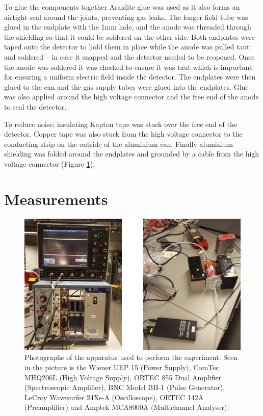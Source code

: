 To glue the components together Araldite glue was used as it also forms an airtight seal around the joints, preventing gas leaks. The longer field tube was glued in the endplate with the 1mm hole, and the anode was threaded through the shielding so that it could be soldered on the other side. Both endplates were taped onto the detector to hold them in place while the anode was pulled taut and soldered -- in case it snapped and the detector needed to be reopened. Once the anode was soldered it was checked to ensure it was taut which is important for ensuring a uniform electric field inside the detector. The endplates were then glued to the can and the gas supply tubes were glued into the endplates. Glue was also applied around the high voltage connector and the free end of the anode to seal the detector.

To reduce noise; insulating Kapton tape was stuck over the free end of the detector. Copper tape was also stuck from the high voltage connector to the conducting strip on the outside of the aluminium can. Finally aluminium shielding was folded around the endplates and grounded by a cable from the high voltage connector (Figure \ref{fig:setup}).

\section{Measurements}

\begin{figure}[h]
  \centering
  \includegraphics[width=\linewidth]{apparatus.jpg}
  \caption{Photographs of the apparatus used to perform the experiment. Seen in the picture is the Wiener UEP 15 (Power Supply), ComTec MHQ206L (High Voltage Supply), ORTEC 855 Dual Amplifier (Spectroscopic Amplifier), BNC Model BH-1 (Pulse Generator), LeCroy Wavesurfer 24Xs-A (Oscilloscope), ORTEC 142A (Preamplifier) and Amptek MCA8000A (Multichannel Analyser).}
  \label{fig:setup}
\end{figure}

